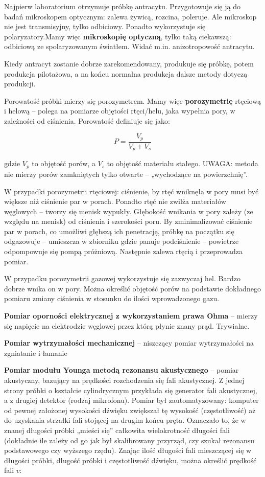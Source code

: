 \documentclass{article}
\begin{document}
\begin{enumerate}
Najpierw laboratorium otrzymuje próbkę antracytu. Przygotowuje się ją do badań mikroskopem optycznym: zalewa żywicą, rozcina, poleruje. Ale mikroskop nie jest transmisyjny, tylko odbiciowy. Ponadto wykorzystuje się polaryzatory.Mamy więc {\bf mikroskopię optyczną}, tylko taką ciekawszą: odbiciową ze spolaryzowanym światłem. Widać m.in. anizotropowość antracytu.

Kiedy antracyt zostanie dobrze zarekomendowany, produkuje się próbkę, potem produkcja pilotażowa, a na końcu normalna produkcja dalsze metody dotyczą produkcji.

Porowatość próbki mierzy się porozymetrem. Mamy więc {\bf porozymetrię} rtęciową i helową  – polega na pomiarze objętości rtęci/helu, jaka wypełnia pory, w zależności od ciśnienia.
Porowatość definiuje się jako:



$$P = \frac{V_p}{V_p+V_s}$$



gdzie $V_p$ to objętość porów, a $V_s$ to objętość materiału stałego. UWAGA: metoda nie mierzy porów zamkniętych tylko otwarte – „wychodzące na powierzchnię”.

W przypadki porozymetrii rtęciowej: ciśnienie, by rtęć wniknęła w pory musi być większe niż ciśnienie par w porach. Ponadto rtęć nie zwilża materiałów węglowych – tworzy się menisk wypukły. Głębokość wnikania w pory zależy (ze względu na menisk) od ciśnienia i szerokości poru. 
By zminimalizować ciśnienie par w porach, co umożliwi głębszą ich penetrację, próbkę na początku się odgazowuje – umieszcza w zbiorniku gdzie panuje podciśnienie – powietrze odpompowuje się pompą próżniową. Następnie zalewa rtęcią i przeprowadza pomiar.

W przypadku porozymetrii gazowej wykorzystuje się zazwyczaj hel. Bardzo dobrze wnika on w pory. Można określić objętość porów na podstawie dokładnego pomiaru zmiany ciśnienia w stosunku do ilości wprowadzonego gazu.



{\bf Pomiar oporności elektrycznej z wykorzystaniem prawa Ohma} – mierzy się napięcie na elektrodzie węglowej przez którą płynie znany prąd. Trywialne.

{\bf Pomiar wytrzymałości mechanicznej}  – niszczący pomiar wytrzymałości na zgniatanie i łamanie

{\bf Pomiar modułu Younga metodą rezonansu akustycznego} – pomiar akustyczny, bazujący na prędkości rozchodzenia się fali akustycznej. Z jednej strony próbki o kształcie cylindrycznym przykłada się generator fali akustycznej, a z drugiej detektor (rodzaj mikrofonu). Pomiar był zautomatyzowany: komputer od pewnej założonej wysokości dźwięku zwiększał tę wysokość (częstotliwość) aż do uzyskania strzałki fali stojącej na drugim końcu pręta. Oznaczało to, że w znanej długości próbki „mieści się” całkowita wielokrotność długości fali (dokładnie ile zależy od
go jak był skalibrowany przyrząd, czy szukał rezonansu podstawowego czy wyższego rzędu). Znając ilość długości fali mieszczącej się w długości próbki, długość próbki i częstotliwość dźwięku, można określić prędkość fali $v$:


\end{enumerate}
\end{document}
